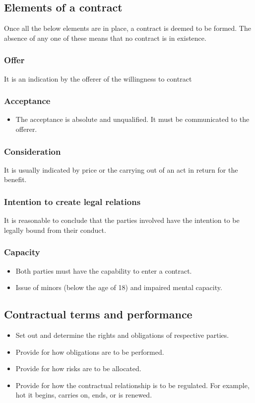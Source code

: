 \documentclass[11pt]{article}
\begin{document}
\clearpage
\subsection{Elements of a contract}
\label{sec:orge3ce41c}
Once all the below elements are in place, a contract is deemed to be formed. The absence of any one of these means that no contract is in existence.
\subsubsection{Offer}
\label{sec:orgb2b8da7}
It is an indication by the offerer of the willingness to contract
\subsubsection{Acceptance}
\label{sec:orga0db484}
\begin{itemize}
\item The acceptance is absolute and unqualified. It must be communicated to the offerer.
\end{itemize}
\subsubsection{Consideration}
\label{sec:org7db04b0}
It is usually indicated by price or the carrying out of an act in return for the benefit.
\subsubsection{Intention to create legal relations}
\label{sec:org06fea5c}
It is reasonable to conclude that the parties involved have the intention to be legally bound from their conduct.
\subsubsection{Capacity}
\label{sec:orgb6a355e}
\begin{itemize}
\item Both parties must have the capability to enter a contract.
\item Issue of minors (below the age of 18) and impaired mental capacity.
\end{itemize}
\subsection{Contractual terms and performance}
\label{sec:orgf88f6c8}
\begin{itemize}
\item Set out and determine the rights and obligations of respective parties.
\item Provide for how obligations are to be performed.
\item Provide for how risks are to be allocated.
\item Provide for how the contractual relationship is to be regulated. For example, hot it begins, carries on, ends, or is renewed.
\end{itemize}
\end{document}
